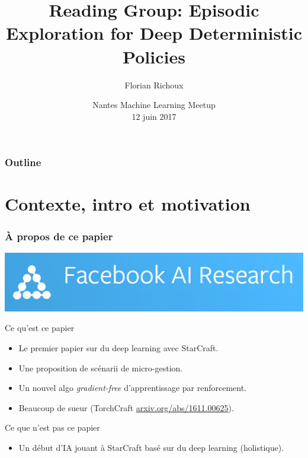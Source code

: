 \documentclass[smaller]{beamer}
\title[Reading group StarCraft AI]{Reading Group: Episodic Exploration for Deep Deterministic Policies}
\author{Florian Richoux}
\date[12/06/17]{Nantes Machine Learning Meetup\\12 juin 2017}
\begin{document}

\frame{\titlepage}


\begin{frame}
  \frametitle{Outline}

  \tableofcontents

\end{frame}


\section{Contexte, intro et motivation}

\begin{frame}
  \frametitle{À propos de ce papier}

  \centerline{\includegraphics[width=0.5\linewidth]{./figs/fair}}

  \bigskip

  {
    \begin{block}{Ce qu'est ce papier}
      \begin{itemize}
      \item<2-> Le premier papier sur du deep learning avec StarCraft.
      \item<3-> Une proposition de scénarii de micro-gestion.
      \item<4-> Un nouvel algo {\it gradient-free} d'apprentissage par renforcement.
      \item<5-> Beaucoup de sueur (TorchCraft \href{https://arxiv.org/abs/1611.00625}{arxiv.org/abs/1611.00625}).
      \end{itemize}
    \end{block}
  }
  
  \medskip

  {
    \begin{alertblock}{Ce que n'est pas ce papier}
      \begin{itemize}
      \item Un début d'IA jouant à StarCraft basé sur du deep learning (holistique).
      \end{itemize}
    \end{alertblock}
  }
  
\end{frame}
\end{document}
